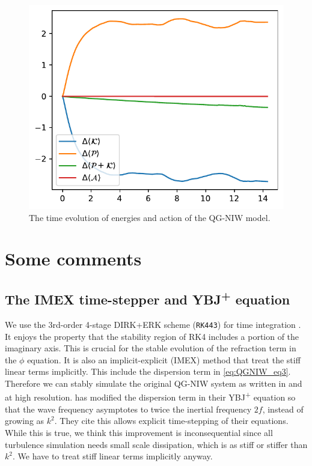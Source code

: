 \begin{figure}
    \centering
    \includegraphics{QGNIW_energies}
    \caption{The time evolution of energies and action of the QG-NIW model.}
    \label{fig:QGNIW_energies}
\end{figure}

\section{Some comments}
\subsection{The IMEX time-stepper and YBJ\textsuperscript{+} equation}
We use the 3rd-order 4-stage DIRK+ERK scheme (\texttt{RK443}) for time integration \parencite[Sec 2.8]{AscherEtAl_97}. It enjoys the property that the stability region of RK4 includes a portion of the imaginary axis. This is crucial for the stable evolution of the refraction term in the $\phi$ equation. It is also an implicit-explicit (IMEX) method that treat the stiff linear terms implicitly. This include the dispersion term in \eqref{eq:QGNIW_eq3}. Therefore we can stably simulate the original QG-NIW system as written in \cite{XieVanneste_15} and \cite{RochaEtAl_18} at high resolution. \cite{AsselinYoung_19} has modified the dispersion term in their YBJ\textsuperscript{+} equation so that the wave frequency asymptotes to twice the inertial frequency $2f$, instead of growing as $k^2$. They cite this allows explicit time-stepping of their equations. While this is true, we think this improvement is inconsequential since all turbulence simulation needs small scale dissipation, which is as stiff or stiffer than $k^2$. We have to treat stiff linear terms implicitly anyway. 

